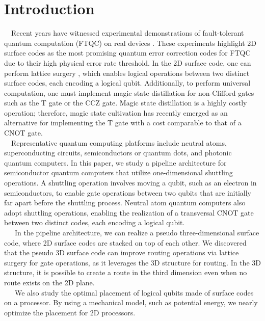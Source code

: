 \documentclass[a4paper,11pt]{ltjsarticle}
\begin{document}
\section{Introduction}
\ \ Recent years have witnessed experimental demonstrations of fault-tolerant quantum computation (FTQC) on real devices \cite{bluvstein2024}\cite{google2024}. These experiments highlight 2D surface codes as the most promising quantum error correction codes for FTQC due to their high physical error rate threshold. In the 2D surface code, one can perform lattice surgery \cite{horsman2012}, which enables logical operations between two distinct surface codes, each encoding a logical qubit. Additionally, to perform universal computation, one must implement magic state distillation \cite{litinski2019} for non-Clifford gates such as the T gate or the CCZ gate. Magic state distillation is a highly costly operation; therefore, magic state cultivation \cite{gidney2024} has recently emerged as an alternative for implementing the T gate with a cost comparable to that of a CNOT gate.\\
\ \ Representative quantum computing platforms include neutral atoms, superconducting circuits, semiconductors or quantum dots, and photonic quantum computers. In this paper, we study a pipeline architecture \cite{cai2023} for semiconductor quantum computers that utilize one-dimensional shuttling operations. A shuttling operation involves moving a qubit, such as an electron in semiconductors, to enable gate operations between two qubits that are initially far apart before the shuttling process. Neutral atom quantum computers also adopt shuttling operations, enabling the realization of a transversal CNOT gate between two distinct codes, each encoding a logical qubit.\\
\ \ \ In the pipeline architecture, we can realize a pseudo three-dimensional surface code, where 2D surface codes are stacked on top of each other. We discovered that the pseudo 3D surface code can improve routing operations via lattice surgery for gate operations, as it leverages the 3D structure for routing. In the 3D structure, it is possible to create a route in the third dimension even when no route exists on the 2D plane.\\
\ \ \ We also study the optimal placement of logical qubits made of surface codes on a processor. By using a mechanical model, such as potential energy, we nearly optimize the placement for 2D processors.\\
\end{document}
